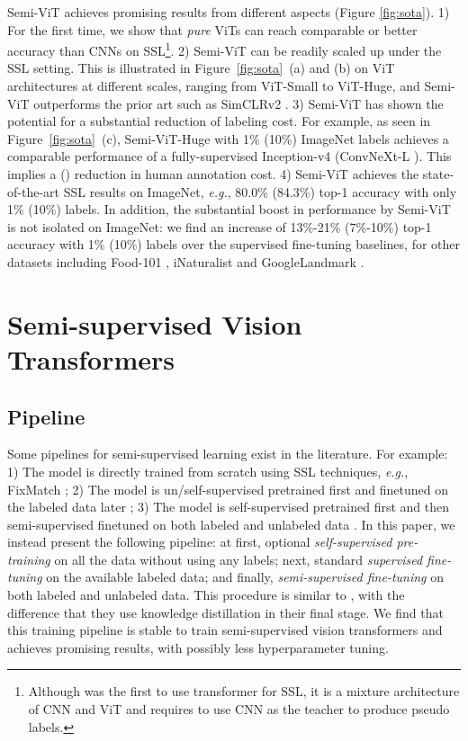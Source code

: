 \documentclass{article}
\newcommand\eg{\emph{e.g.}}
\begin{document}
Semi-ViT achieves promising results from different aspects (Figure \ref{fig:sota}).
1) For the first time, we show that \emph{pure} ViTs can reach comparable or better accuracy than CNNs on SSL\footnote{Although \cite{weng2021semi} was the first to use transformer for SSL, it is a mixture architecture of CNN and ViT and requires to use CNN as the teacher to produce pseudo labels.}.
2) Semi-ViT can be readily scaled up under the SSL setting. 
This is illustrated in Figure~\ref{fig:sota}~(a) and (b) on ViT architectures at different scales, ranging from ViT-Small to ViT-Huge, and Semi-ViT outperforms the prior art such as SimCLRv2 \cite{DBLP:conf/nips/ChenKSNH20}. 3) Semi-ViT has shown the potential for a substantial reduction of labeling cost. For example, as seen in Figure~\ref{fig:sota}~(c), Semi-ViT-Huge with 1\% (10\%) ImageNet labels achieves a comparable performance of a fully-supervised Inception-v4 \cite{DBLP:conf/aaai/SzegedyIVA17} (ConvNeXt-L \cite{liu2022convnet}). This implies a  () reduction in human annotation cost.
4) Semi-ViT achieves the state-of-the-art SSL results on ImageNet, \eg, 80.0\% (84.3\%) top-1 accuracy with only 1\% (10\%) labels. In addition, the substantial boost in performance by Semi-ViT is not isolated on ImageNet: we find an increase of 13\%-21\% (7\%-10\%) top-1 accuracy with 1\% (10\%) labels over the supervised fine-tuning baselines, for other datasets including Food-101 \cite{DBLP:conf/eccv/BossardGG14}, iNaturalist \cite{DBLP:journals/corr/HornASSAPB17} and GoogleLandmark \cite{DBLP:conf/iccv/NohASWH17}.


\section{Semi-supervised Vision Transformers}


\subsection{Pipeline}

Some pipelines for semi-supervised learning exist in the literature. For example:
1) The model is directly trained from scratch using SSL techniques, \eg, FixMatch \cite{DBLP:conf/nips/SohnBCZZRCKL20}; 
2) The model is un/self-supervised pretrained first and finetuned on the labeled data later \cite{DBLP:conf/cvpr/He0WXG20,DBLP:conf/icml/ChenK0H20,DBLP:conf/nips/GrillSATRBDPGAP20}; 
3) The model is self-supervised pretrained first and then semi-supervised finetuned on both labeled and unlabeled data \cite{DBLP:conf/cvpr/CaiRMFTS21}. 
In this paper, we instead present the following pipeline: at first, optional \emph{self-supervised pre-training} on all the data without using any labels; next, standard \emph{supervised fine-tuning} on the available labeled data; and finally, \emph{semi-supervised fine-tuning} on both labeled and unlabeled data. This procedure is similar to \cite{DBLP:conf/nips/ChenKSNH20}, with the difference that they use knowledge distillation \cite{DBLP:journals/corr/HintonVD15} in their final stage. We find that this training pipeline is stable to train semi-supervised vision transformers and achieves promising results, with possibly less hyperparameter tuning.  
\end{document}
